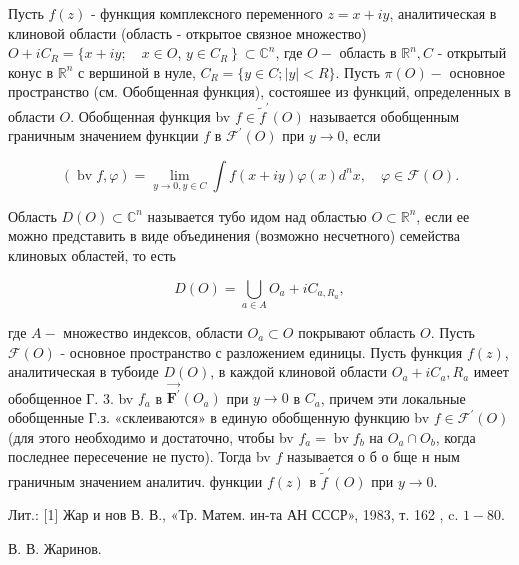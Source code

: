 \documentclass[10pt]{article}
\begin{document}
Пусть $f(z)$ - функщия комплексного переменного $z=x+i y$, аналитическая в клиновой области (область - открытое связное множество) $O+i C_{R}=\{x+i y ; \quad x \in O$, $\left.y \in C_{R}\right\} \subset \mathbb{C}^{n}$, где $O-$ область в $\mathbb{R}^{n}, C$ - открытый конус в $\mathbb{R}^{n}$ с вершиной в нуле, $C_{R}=\{y \in C ;|y|<R\}$. Пусть $\mathscr{\pi}(O)-$ основное пространство (см. Обобщенная функция), состояшее из функций, определенных в области $O$. Обобщенная функция bv $f \in \widetilde{f}^{\prime}(O)$ называется обобщенным граничным значением функции $f$ в $\mathscr{F}^{\prime}(O)$ при $y \rightarrow 0$, если



\[

(\operatorname{bv} f, \varphi)=\lim _{y \rightarrow 0, y \in C} \int f(x+i y) \varphi(x) d^{n} x, \quad \varphi \in \mathscr{F}(O) .

\]



Область $D(O) \subset \mathbb{C}^{n}$ называется тубо идом над областью $O \subset \mathbb{R}^{n}$, если ее можно представить в виде объединения (возможно несчетного) семейства клиновых областей, то есть



\[

D(O)=\bigcup_{a \in A} O_{a}+i C_{a, R_{a}},

\]



где $A-$ множество индексов, области $O_{a} \subset O$ покрывают область $O$. Пусть $\mathscr{F}(O)$ - основное пространство с разложением единицы. Пусть функция $f(z)$, аналитическая в тубоиде $D(O)$, в каждой клиновой области $O_{a}+i C_{a}, R_{a}$ имеет обобщенное Г. 3. bv $f_{a}$ в $\overrightarrow{\boldsymbol{F}^{\prime}}\left(O_{a}\right)$ при $y \rightarrow 0$ в $C_{a}$, причем эти локальные обобщенные Г.з. «склеиваются» в единую обобщенную функцию bv $f \in \mathscr{F}^{\prime}(O)$ (для этого необходимо и достаточно, чтобы bv $f_{a}=\operatorname{bv} f_{b}$ на $O_{a} \cap O_{b}$, когда последнее пересечение не пусто). Тогда bv $f$ называется о б о бще н ным граничным значением аналитич. функции $f(z)$ в $\widetilde{f}^{\prime}(O)$ при $y \rightarrow 0$.



Лит.: [1] Жар и нов В. В., «Тр. Матем. ин-та АН СССР», 1983, т. 162 , c. $1-80$.



В. В. Жаринов.
\end{document}
